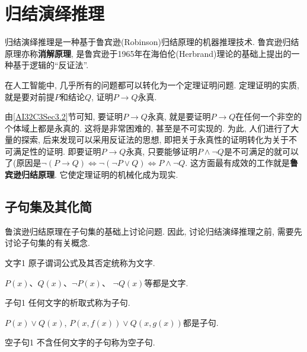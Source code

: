\section{归结演绎推理}
归结演绎推理是一种基于鲁宾逊(Robinson)归结原理的机器推理技术. 鲁宾逊归结原理亦称\textbf{消解原理}, 是鲁宾逊于1965年在海伯伦(Herbrand)理论的基础上提出的一种基于逻辑的“反证法”.

在人工智能中, 几乎所有的问题都可以转化为一个定理证明问题. 定理证明的实质, 就是要对前提$P$和结论$Q$, 证明$P\rightarrow Q$永真.

由\ref{AI32C3Sec3.2}节可知, 要证明$P\rightarrow Q$永真, 就是要证明$P\rightarrow Q$在任何一个非空的个体域上都是永真的. 这将是非常困难的, 甚至是不可实现的.
为此, 人们进行了大量的探索, 后来发现可以采用反证法的思想, 即把关于永真性的证明转化为关于不可满足性的证明.
即要证明$P\rightarrow Q$永真, 只要能够证明$P\wedge \neg Q$是不可满足的就可以了(原因是$\neg  (P\rightarrow Q) \Leftrightarrow  \neg (\neg  P\vee Q) \Leftrightarrow  P\wedge \neg  Q$.
这方面最有成效的工作就是\textbf{鲁宾逊归结原理}. 它使定理证明的机械化成为现实.
\subsection{子句集及其化简}

鲁滨逊归结原理在子句集的基础上讨论问题. 因此, 讨论归结演绎推理之前, 需要先讨论子句集的有关概念.

\begin{mydef}{文字}{1}
原子谓词公式及其否定统称为文字.
\end{mydef}

\begin{example}
  $P(x)$、$Q(x)$、$\neg  P(x)$、 $\neg  Q(x)$等都是文字.
\end{example}

\begin{mydef}{子句}{1}
   任何文字的析取式称为子句.
\end{mydef}

\begin{example}
  $P(x)\vee Q(x)$, $P(x, f(x))\vee Q(x,g(x))$都是子句.
\end{example}

\begin{mydef}{空子句}{1}
   不含任何文字的子句称为空子句.
\end{mydef}

